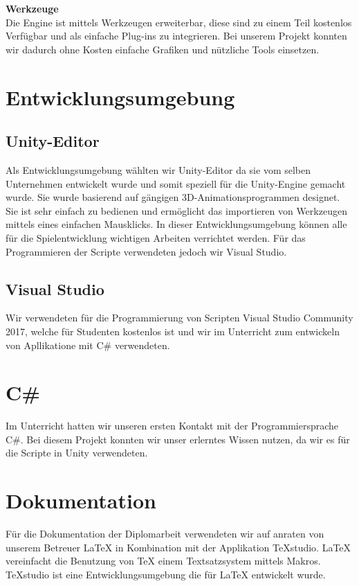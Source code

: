 \textbf{Werkzeuge}\\
Die Engine ist mittels Werkzeugen erweiterbar, diese sind zu einem Teil kostenlos Verfügbar und als einfache Plug-ins zu integrieren. Bei unserem Projekt konnten wir dadurch ohne Kosten einfache Grafiken und nützliche Tools einsetzen.\\
\cite{Unity-Engine}

\section{Entwicklungsumgebung}
\subsection{Unity-Editor}
Als Entwicklungsumgebung wählten wir Unity-Editor da sie vom selben Unternehmen entwickelt wurde und somit speziell für die Unity-Engine gemacht wurde. Sie wurde basierend auf gängigen 3D-Animationsprogrammen designet. Sie ist sehr einfach zu bedienen und ermöglicht das importieren von Werkzeugen mittels eines einfachen Mausklicks. In dieser Entwicklungsumgebung können alle für die Spielentwicklung wichtigen Arbeiten verrichtet werden. Für das Programmieren der Scripte verwendeten jedoch wir Visual Studio. \cite{Unity-Engine}

\subsection{Visual Studio}
Wir verwendeten für die Programmierung von Scripten Visual Studio Community 2017, welche für Studenten kostenlos ist und wir im Unterricht zum entwickeln von Apllikatione mit C\#  verwendeten. 

\section{C\#}
Im Unterricht hatten wir unseren ersten Kontakt mit der Programmiersprache C\#. Bei diesem Projekt konnten wir unser erlerntes Wissen nutzen, da wir es für die Scripte in Unity verwendeten. 

\section{Dokumentation}
Für die Dokumentation der Diplomarbeit verwendeten wir auf anraten von unserem Betreuer LaTeX in Kombination mit der Applikation TeXstudio.
LaTeX vereinfacht die Benutzung von TeX einem Textsatzsystem mittels Makros. TeXstudio ist eine Entwicklungsumgebung die für LaTeX entwickelt wurde. \cite{Latex}
